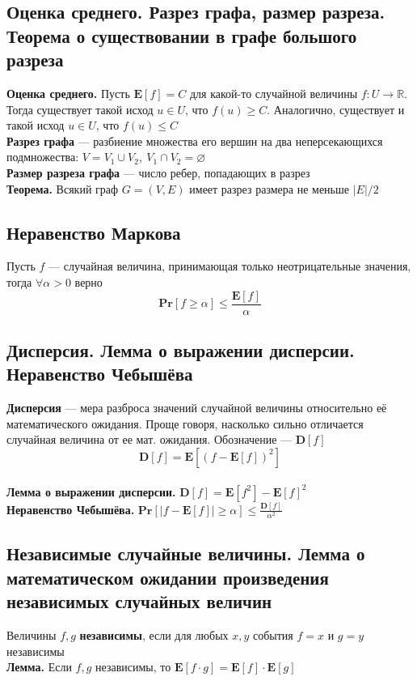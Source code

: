 \documentclass[a4paper]{article}
\begin{document}
\subsection{Оценка среднего. Разрез графа, размер разреза. Теорема о существовании в графе большого разреза}
\textbf{Оценка среднего.} Пусть $\textbf{E}[f]=C$ для какой-то случайной величины $f:U\to\mathbb{R}$. Тогда существует такой исход $u\in U$, что $f(u)\geqslant C$. Аналогично, существует и такой исход $u\in U$, что $f(u)\leqslant C$\\[2mm]
\indent\textbf{Разрез графа} — разбиение множества его вершин на два неперсекающихся подмножества: $V=V_1\cup V_2,\ V_1\cap V_2=\varnothing$\\[2mm]
\indent\textbf{Размер разреза графа} — число ребер, попадающих в разрез\\[2mm]
\indent\textbf{Теорема.} Всякий граф $G=(V,E)$ имеет разрез размера не меньше $|E|/2$

\subsection{Неравенство Маркова}
Пусть $f$ — случайная величина, принимающая только неотрицательные значения, тогда $\forall\alpha>0$ верно $$\boxed{\textbf{Pr}[f\geqslant\alpha]\leqslant\displaystyle\frac{\textbf{E}[f]}{\alpha}}$$

\subsection{Дисперсия. Лемма о выражении дисперсии. Неравенство Чебышёва}
\textbf{Дисперсия} — мера разброса значений случайной величины относительно её математического ожидания. Проще говоря, насколько сильно отличается случайная величина от ее мат. ожидания. Обозначение — $\textbf{D}[f]$ 
$$\boxed{\textbf{D}\left[f\right]=\textbf{E}\left[(f-\textbf{E}[f])^2\right]}$$\\[2mm]
\indent\textbf{Лемма о выражении дисперсии.} $\textbf{D}\left[f\right]=\textbf{E}\left[f^2\right]-\textbf{E}\left[f\right]^2$\\[2mm]
\indent\textbf{Неравенство Чебышёва.} $\textbf{Pr}\left[\left|f-\textbf{E}[f]\right|\geqslant\alpha\right]\leqslant\displaystyle\frac{\textbf{D}[f]}{\alpha^2}$

\subsection{Независимые случайные величины. Лемма о математическом ожидании произведения независимых случайных величин}
Величины $f, g$ \textbf{независимы}, если для любых $x,y$ события $f = x$ и $g = y$ независимы\\[2mm]
\indent\textbf{Лемма.} Если $f,g$ независимы, то $\textbf{E}[f\cdot g]=\textbf{E}[f]\cdot\textbf{E}[g]$
\end{document}
